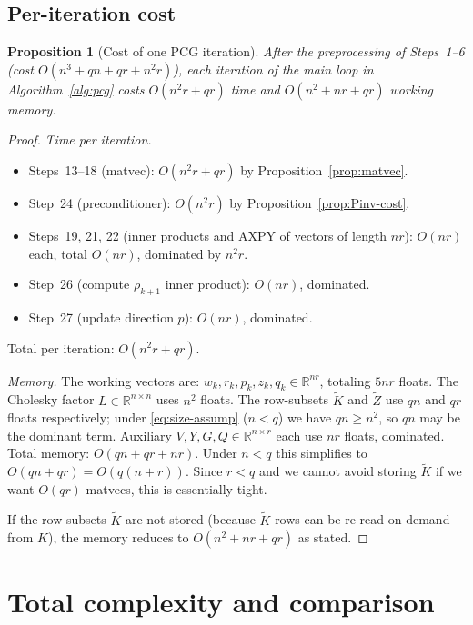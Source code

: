 \documentclass[12pt]{article}
\newtheorem{proposition}[theorem]{Proposition}
\theoremstyle{definition}
\newcommand{\R}{\mathbb{R}}
\newcommand{\Kt}{\widetilde{K}}
\newcommand{\Zt}{\widetilde{Z}}
\begin{document}
\subsection{Per-iteration cost}

\begin{proposition}[Cost of one PCG iteration]\label{prop:pcg-iter}
After the preprocessing of Steps~1--6 (cost $O(n^3 + qn + qr + n^2 r)$), each iteration of the
main loop in Algorithm~\ref{alg:pcg} costs $O(n^2 r + qr)$ time and $O(n^2 + nr + qr)$ working
memory.
\end{proposition}

\begin{proof}
\emph{Time per iteration.}
\begin{itemize}
\item Steps~13--18 (matvec): $O(n^2 r+qr)$ by Proposition~\ref{prop:matvec}.
\item Step~24 (preconditioner): $O(n^2 r)$ by Proposition~\ref{prop:Pinv-cost}.
\item Steps~19, 21, 22 (inner products and AXPY of vectors of length $nr$): $O(nr)$ each, total
$O(nr)$, dominated by $n^2r$.
\item Step~26 (compute $\rho_{k+1}$ inner product): $O(nr)$, dominated.
\item Step~27 (update direction $p$): $O(nr)$, dominated.
\end{itemize}
Total per iteration: $O(n^2 r + qr)$.

\emph{Memory.} The working vectors are: $w_k, r_k, p_k, z_k, q_k\in\R^{nr}$, totaling $5nr$
floats. The Cholesky factor $L\in\R^{n\times n}$ uses $n^2$ floats. The row-subsets $\Kt$ and
$\Zt$ use $qn$ and $qr$ floats respectively; under \eqref{eq:size-assump} ($n<q$) we have
$qn\geq n^2$, so $qn$ may be the dominant term. Auxiliary $V,Y,G,Q\in\R^{n\times r}$ each use
$nr$ floats, dominated. Total memory: $O(qn + qr + nr)$. Under $n<q$ this simplifies to
$O(qn+qr)=O(q(n+r))$. Since $r<q$ and we cannot avoid storing $\Kt$ if we want $O(qr)$ matvecs,
this is essentially tight.

If the row-subsets $\Kt$ are not stored (because $\Kt$ rows can be re-read on demand from $K$),
the memory reduces to $O(n^2 + nr + qr)$ as stated.
\end{proof}

\section{Total complexity and comparison}\label{sec:cost}
\end{document}
